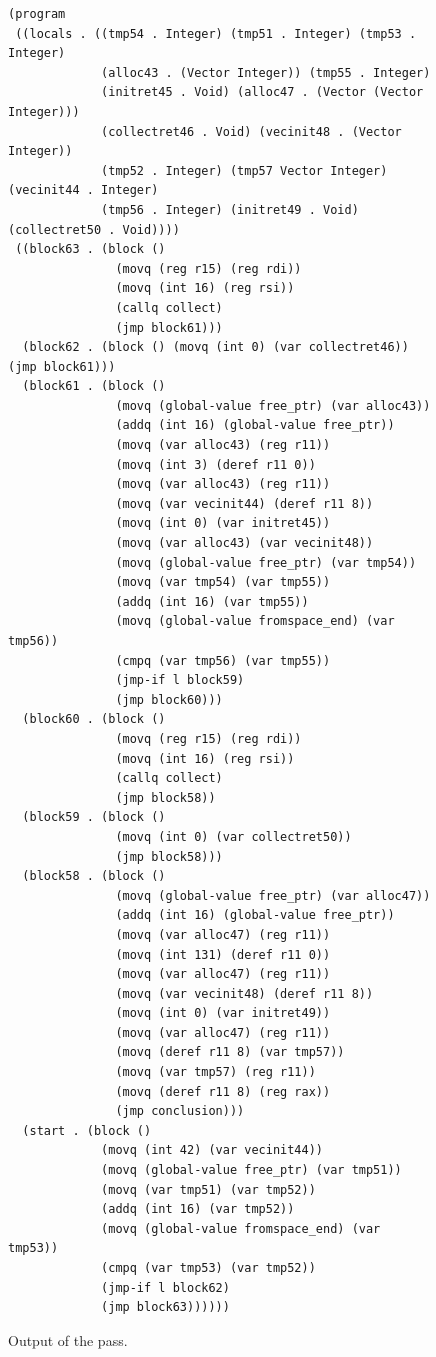 \documentclass[11pt]{book}
\begin{document}
\begin{figure}[tbp]
\centering
\begin{minipage}{0.75\textwidth}
\begin{lstlisting}[basicstyle=\ttfamily\scriptsize]
(program
 ((locals . ((tmp54 . Integer) (tmp51 . Integer) (tmp53 . Integer)
             (alloc43 . (Vector Integer)) (tmp55 . Integer)
             (initret45 . Void) (alloc47 . (Vector (Vector Integer)))
             (collectret46 . Void) (vecinit48 . (Vector Integer))
             (tmp52 . Integer) (tmp57 Vector Integer) (vecinit44 . Integer)
             (tmp56 . Integer) (initret49 . Void) (collectret50 . Void))))
 ((block63 . (block ()
               (movq (reg r15) (reg rdi))
               (movq (int 16) (reg rsi))
               (callq collect)
               (jmp block61)))
  (block62 . (block () (movq (int 0) (var collectret46)) (jmp block61)))
  (block61 . (block ()
               (movq (global-value free_ptr) (var alloc43))
               (addq (int 16) (global-value free_ptr))
               (movq (var alloc43) (reg r11))
               (movq (int 3) (deref r11 0))
               (movq (var alloc43) (reg r11))
               (movq (var vecinit44) (deref r11 8))
               (movq (int 0) (var initret45))
               (movq (var alloc43) (var vecinit48))
               (movq (global-value free_ptr) (var tmp54))
               (movq (var tmp54) (var tmp55))
               (addq (int 16) (var tmp55))
               (movq (global-value fromspace_end) (var tmp56))
               (cmpq (var tmp56) (var tmp55))
               (jmp-if l block59)
               (jmp block60)))
  (block60 . (block ()
               (movq (reg r15) (reg rdi))
               (movq (int 16) (reg rsi))
               (callq collect)
               (jmp block58))
  (block59 . (block () 
               (movq (int 0) (var collectret50)) 
               (jmp block58)))
  (block58 . (block ()
               (movq (global-value free_ptr) (var alloc47))
               (addq (int 16) (global-value free_ptr))
               (movq (var alloc47) (reg r11))
               (movq (int 131) (deref r11 0))
               (movq (var alloc47) (reg r11))
               (movq (var vecinit48) (deref r11 8))
               (movq (int 0) (var initret49))
               (movq (var alloc47) (reg r11))
               (movq (deref r11 8) (var tmp57))
               (movq (var tmp57) (reg r11))
               (movq (deref r11 8) (reg rax))
               (jmp conclusion)))
  (start . (block ()
             (movq (int 42) (var vecinit44))
             (movq (global-value free_ptr) (var tmp51))
             (movq (var tmp51) (var tmp52))
             (addq (int 16) (var tmp52))
             (movq (global-value fromspace_end) (var tmp53))
             (cmpq (var tmp53) (var tmp52))
             (jmp-if l block62)
             (jmp block63))))))
\end{lstlisting}
\end{minipage}
\caption{Output of the  pass.}
\label{fig:select-instr-output-gc}
\end{figure}
\end{document}
